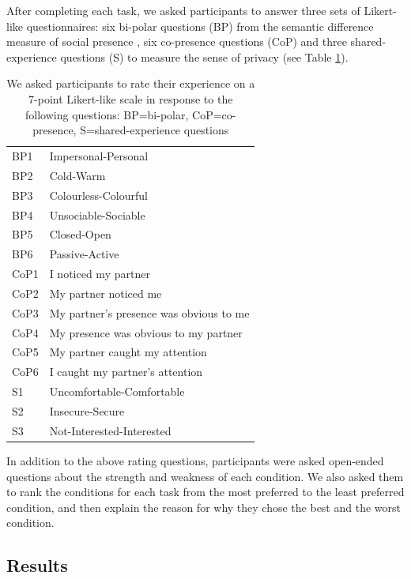 After completing each task, we asked participants to answer three sets of Likert-like questionnaires: six bi-polar questions (BP) from the semantic difference measure of social presence \cite{Smith2018}, six co-presence questions (CoP) and three shared-experience questions (S) to measure the sense of privacy (see Table \ref{tab:frontier:questions}).  

\begin{table}
    \centering
    \caption{We asked participants to rate their experience on a 7-point Likert-like scale in response to the following questions: BP=bi-polar, CoP=co-presence, S=shared-experience questions}
    \begin{tabular}{ll}
BP1 &    Impersonal-Personal\\
BP2 &    Cold-Warm\\
BP3 &    Colourless-Colourful\\
BP4 &    Unsociable-Sociable\\
BP5 &    Closed-Open\\
BP6 &    Passive-Active\\
CoP1    &   I noticed my partner\\
CoP2    &   My partner noticed me\\
CoP3    &   My partner's presence was obvious to me\\
CoP4    &   My presence was obvious to my partner\\
CoP5    &   My partner caught my attention \\
CoP6    &   I caught my partner's attention\\
S1  & Uncomfortable-Comfortable\\
S2  & Insecure-Secure\\
S3  & Not-Interested-Interested\\
    \end{tabular}
    \label{tab:frontier:questions}
\end{table}

In addition to the above rating questions, participants were asked open-ended questions about the strength and weakness of each condition. We also asked them to rank the conditions for each task from the most preferred to the least preferred condition, and then explain the reason for why they chose the best and the worst condition. 

\subsection{Results}


